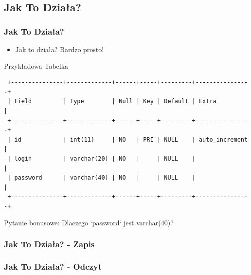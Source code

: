\documentclass{beamer}
\begin{document}
\subsection{Jak To Działa?}
\begin{frame}[fragile]
  \frametitle{Jak To Działa?}
  \begin{itemize}
    \item Jak to działa? Bardzo prosto!
  \end{itemize}
  \begin{block}{Przykładowa Tabelka}
    \scriptsize
    \begin{verbatim}
 +---------------+-------------+------+-----+---------+----------------+
 | Field         | Type        | Null | Key | Default | Extra          |
 +---------------+-------------+------+-----+---------+----------------+
 | id            | int(11)     | NO   | PRI | NULL    | auto_increment | 
 | login         | varchar(20) | NO   |     | NULL    |                | 
 | password      | varchar(40) | NO   |     | NULL    |                |
 +---------------+-------------+------+-----+---------+----------------+
    \end{verbatim}
    \normalsize
  \end{block}
  \pause
  Pytanie bonusowe: Dlaczego `password` jest varchar(40)?
\end{frame}
\begin{frame}
  \frametitle{Jak To Działa? - Zapis}
\end{frame}
\begin{frame}
  \frametitle{Jak To Działa? - Odczyt}
\end{frame}
\end{document}
